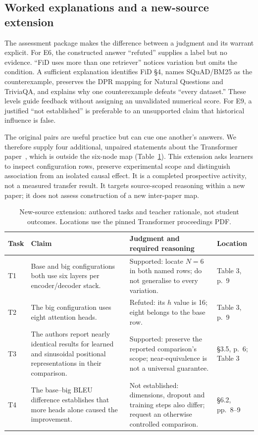 \subsection{Worked explanations and a new-source extension}
The assessment package makes the difference between a judgment and its warrant explicit. For E6, the constructed answer ``refuted'' supplies a label but no evidence. ``FiD uses more than one retriever'' notices variation but omits the condition. A sufficient explanation identifies FiD \S4, names SQuAD/BM25 as the counterexample, preserves the DPR mapping for Natural Questions and TriviaQA, and explains why one counterexample defeats ``every dataset.'' These levels guide feedback without assigning an unvalidated numerical score. For E9, a justified ``not established'' is preferable to an unsupported claim that historical influence is false.

The original pairs are useful practice but can cue one another's answers. We therefore supply four additional, unpaired statements about the Transformer paper~\cite{transformer}, which is outside the six-node map (Table~\ref{tab:newsource}). This extension asks learners to inspect configuration rows, preserve experimental scope and distinguish association from an isolated causal effect. It is a completed prospective activity, not a measured transfer result. It targets source-scoped reasoning within a new paper; it does not assess construction of a new inter-paper map.

\begin{table}[t]
\caption{New-source extension: authored tasks and teacher rationale, not student outcomes. Locations use the pinned Transformer proceedings PDF.}
\label{tab:newsource}
\begin{tabular}{@{}p{}p{}p{}p{}@{}}
\toprule
Task & Claim & Judgment and required reasoning & Location\\
\midrule
T1 & Base and big configurations both use six layers per encoder/decoder stack. & Supported: locate $N=6$ in both named rows; do not generalise to every variation. & Table 3, p.\ 9\\
T2 & The big configuration uses eight attention heads. & Refuted: its $h$ value is 16; eight belongs to the base row. & Table 3, p.\ 9\\
T3 & The authors report nearly identical results for learned and sinusoidal positional representations in their comparison. & Supported: preserve the reported comparison's scope; near-equivalence is not a universal guarantee. & \S3.5, p.\ 6; Table 3\\
T4 & The base--big BLEU difference establishes that more heads alone caused the improvement. & Not established: dimensions, dropout and training steps also differ; request an otherwise controlled comparison. & \S6.2, pp.\ 8--9\\
\bottomrule
\end{tabular}
\end{table}

